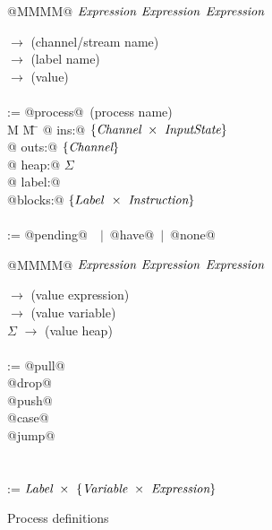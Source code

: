 
\begin{figure}
\begin{minipage}[t]{0.4\textwidth}
\begin{tabbing}
\Instr \TABDEF @MMMM@  \TABSKIP $\textit{Expression}$ \TABSKIP $\textit{Expression}$ \TABSKIP $\textit{Expression}$ \kill

\Chan \> $\to$ \> (channel/stream name) \\
\Label \> $\to$ \> (label name) \\
\Value \> $\to$ \> (value) \\
\\

\Proc \>:=\> @process@~(process name) \\
M \= M \= \kill
\> \> @   ins:@  $\{\textit{Channel} ~\times~ \textit{InputState}\}$ \\
\> \> @  outs:@  $\{ \textit{Channel} \}$ \\
\> \> @  heap:@  $\Sigma$ \\
\> \> @ label:@  \Label \\
\> \> @blocks:@  $\{Label ~\times~ \textit{Instruction}\}$ \\
\\
\Instr \TABDEF \kill
\InputState \> := \> @pending@~\Value~$|$~@have@~$|$~@none@

\end{tabbing}
\end{minipage}
\begin{minipage}[t]{0.05\textwidth}
\quad
\end{minipage}
\begin{minipage}[t]{0.4\textwidth}
\begin{tabbing}
\Instr \TABDEF @MMMM@  \TABSKIP $\textit{Expression}$ \TABSKIP $\textit{Expression}$ \TABSKIP $\textit{Expression}$ \kill

\Exp \> $\to$ \> (value expression) \\
\Var \> $\to$ \> (value variable) \\
$\Sigma$ \> $\to$ \> (value heap) \\
\\

\Instr
    \> :=\> @pull@  \> \Chan  \> \Var  \> \Next \\
    \TABALT @drop@  \> \Chan  \>       \> \Next \\
    \TABALT @push@  \> \Chan  \> \Exp  \> \Next \\
    \TABALT @case@  \> \Exp   \> \Next \> \Next \\
    \TABALT @jump@  \>        \>       \> \Next \\
\\
\\
\Next \> := \> $\textit{Label}~\times~\{\textit{Variable} ~\times~ \textit{Expression}\}$ \\
\end{tabbing}
\end{minipage}

\caption{Process definitions}
\label{fig:Process:Def}
\end{figure}



